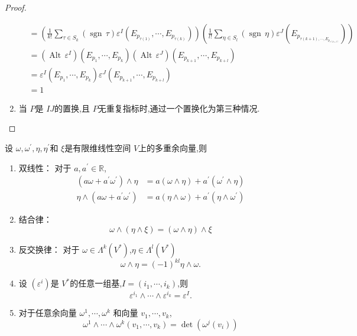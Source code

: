 \documentclass[../../几何与拓扑.tex]{subfiles}
\begin{document}
\begin{proof}
\begin{enumerate}
$$\begin{aligned}
        & = \left( \frac{1}{k!} \sum_{\tau \in S_{k}} \left( \operatorname{sgn}\,\tau \right) \varepsilon ^{I} \left( E_{p_{\tau\left( 1 \right) }},\cdots , E_{p_{\tau\left( k \right) }} \right)   \right) \left(  \frac{1}{l!} \sum_{\eta \in S_{l}}\left( \operatorname{sgn}\,\eta \right) \varepsilon ^{J}\left(  E_{p_{\tau\left( k+ 1 \right),\cdots ,E_{p_{\tau\left( k+ l \right) }} }} \right)  \right)    \\ 
         & = \left( \operatorname{Alt}\, \varepsilon ^{I} \right)\left( E_{p_1},\cdots ,E_{p_{k}} \right) \left( \operatorname{Alt}\,  \varepsilon ^{J} \right)\left( E_{p_{k+ 1}},\cdots ,E_{p_{k+ l}} \right)  \\ 
          & =  \varepsilon ^{I}\left( E_{p_1},\cdots ,E_{p_{k}} \right)  \varepsilon ^{J}\left( E_{p_{k+ 1}} ,\cdots ,E_{p_{k+ l}}\right)\\ 
        & = 1    
        \end{aligned}
        $$  
        \item 当 $ P $是 $I J $的置换,且 $ P $无重复指标时,通过一个置换化为第三种情况.   
    \end{enumerate}
     
\end{proof}

\begin{proposition}
    设 $  \omega , \omega ^{\prime} ,\eta,\eta^{\prime}  $和 $  \xi  $是有限维线性空间  $ V $上的多重余向量,则
    \begin{enumerate}
        \item 双线性： 对于 $ a,a^{\prime}  \in \mathbb{R}  $, $$
        \begin{aligned}
        \left( a \omega + a^{\prime}  \omega ^{\prime}  \right)\wedge \eta&= a\left(  \omega \wedge \eta \right) + a^{\prime} \left(  \omega ^{\prime} \wedge \eta \right)    \\ 
         \eta\wedge \left( a \omega + a^{\prime}  \omega ^{\prime}  \right)& =  a\left( \eta \wedge  \omega  \right)+ a^{\prime} \left( \eta \wedge  \omega ^{\prime}  \right)   
        \end{aligned}
        $$ 
        \item 结合律： $$
         \omega \wedge \left( \eta \wedge  \xi  \right)= \left(  \omega \wedge \eta  \right)\wedge  \xi   
        $$
        \item 反交换律： 对于 $  \omega \in  \Lambda ^{k}\left( V^{*} \right)  $,$ \eta \in  \Lambda ^{l}\left( V^{*} \right)   $ $$
         \omega \wedge \eta  = \left( -1 \right)^{kl} \eta \wedge  \omega . 
        $$
        \item 设 $ \left(  \varepsilon ^{i} \right)  $是 $ V^{*} $的任意一组基,$ I=\left( i_1,\cdots ,i_{k} \right)  $,则 $$
         \varepsilon ^{i_1}\wedge \cdots \wedge  \varepsilon ^{i_{k}} =  \varepsilon ^{I}.
        $$     
        \item 对于任意余向量 $  \omega ^{1},\cdots , \omega ^{k} $ 和向量 $ v_1,\cdots ,v_{k} $,$$
         \omega ^{1}\wedge \cdots \wedge  \omega ^{k}\left( v_1,\cdots ,v_{k} \right) = \det \left(  \omega ^{j}\left( v_{i} \right)  \right)  
        $$ 
    \end{enumerate}
\end{proposition}
\end{document}
